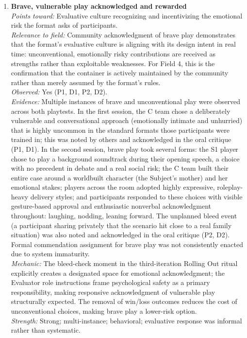 \begin{enumerate}
\item \textbf{Brave, vulnerable play acknowledged and rewarded}\\
\textit{Points toward:} Evaluative culture recognizing and incentivizing the emotional risk the format asks of participants.\\
\textit{Relevance to field:} Community acknowledgment of brave play demonstrates that the format's evaluative culture is aligning with its design intent in real time: unconventional, emotionally risky contributions are received as strengths rather than exploitable weaknesses. For Field 4, this is the confirmation that the container is actively maintained by the community rather than merely assumed by the format's rules.\\
\textit{Observed:} Yes (P1, D1, P2, D2).\\
\textit{Evidence:} Multiple instances of brave and unconventional play were observed across both playtests. In the first session, the C team chose a deliberately vulnerable and conversational approach (emotionally intimate and unhurried) that is highly uncommon in the standard formats those participants were trained in; this was noted by others and acknowledged in the oral critique (P1, D1). In the second session, brave play took several forms: the S1 player chose to play a background soundtrack during their opening speech, a choice with no precedent in debate and a real social risk; the C team built their entire case around a worldbuilt character (the Subject's mother) and her emotional stakes; players across the room adopted highly expressive, roleplay-heavy delivery styles; and participants responded to these choices with visible gesture-based approval and enthusiastic nonverbal acknowledgment throughout: laughing, nodding, leaning forward. The unplanned bleed event (a participant sharing privately that the scenario hit close to a real family situation) was also noted and acknowledged in the oral critique (P2, D2). Formal commendation assignment for brave play was not consistently enacted due to system immaturity.\\
\textit{Mechanic:} The bleed-check moment in the third-iteration Rolling Out ritual explicitly creates a designated space for emotional acknowledgment; the Evaluator role instructions frame psychological safety as a primary responsibility, making responsive acknowledgment of vulnerable play structurally expected. The removal of win/loss outcomes reduces the cost of unconventional choices, making brave play a lower-risk option.\\
\textit{Strength:} Strong; multi-instance; behavioral; evaluative response was informal rather than systematic.


\end{enumerate}
